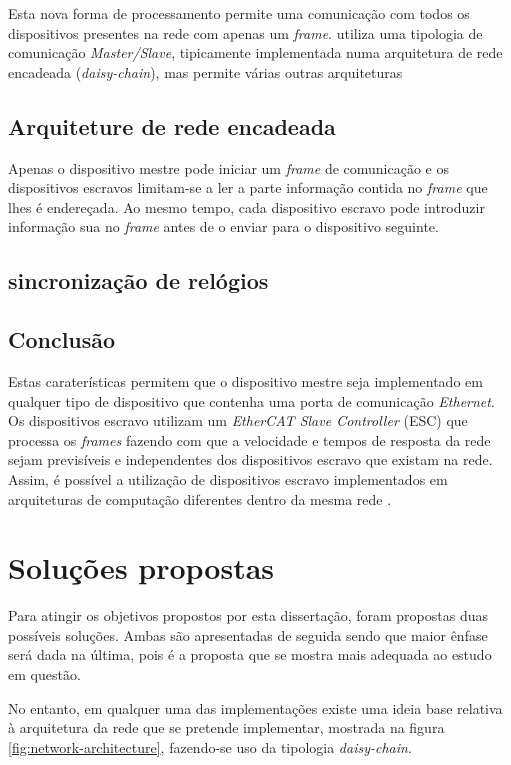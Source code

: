 Esta nova forma de processamento permite uma comunicação com todos os
dispositivos presentes na rede com apenas um \emph{frame}. \ecat utiliza
uma tipologia de comunicação \emph{Master/Slave}, tipicamente implementada
numa arquitetura de rede encadeada (\emph{daisy-chain}), mas permite várias
outras arquiteturas %

\subsection{Arquiteture de rede encadeada}
Apenas o dispositivo mestre pode iniciar um \emph{frame} de comunicação
e os dispositivos escravos limitam-se a ler a parte informação contida
no \emph{frame} que lhes é endereçada. Ao mesmo tempo, cada dispositivo
escravo pode introduzir informação sua  no \emph{frame} antes de o enviar
para o dispositivo seguinte.

\subsection{sincronização de relógios}


\subsection{Conclusão}
Estas caraterísticas permitem que o dispositivo mestre seja implementado
em qualquer tipo de dispositivo que contenha uma porta de comunicação 
\emph{Ethernet}. Os dispositivos escravo utilizam um \emph{EtherCAT Slave
Controller} (ESC) que processa os \emph{frames} fazendo com que a velocidade
e tempos de resposta da rede sejam previsíveis e independentes dos 
dispositivos escravo que existam na rede. Assim, é possível a utilização
de dispositivos escravo implementados em arquiteturas de computação
diferentes dentro da mesma rede \ecat.


\section{Soluções propostas} \label{sec:solution}

Para atingir os objetivos propostos por esta dissertação, foram propostas 
duas possíveis soluções. Ambas são apresentadas de seguida sendo que
maior ênfase será dada na última, pois é a proposta que se mostra mais
adequada ao estudo em questão.

No entanto, em qualquer uma das implementações existe uma ideia base
relativa à arquitetura da rede \ecat que se pretende implementar,
mostrada na figura \ref{fig:network-architecture}, fazendo-se uso da
tipologia \emph{daisy-chain}.

